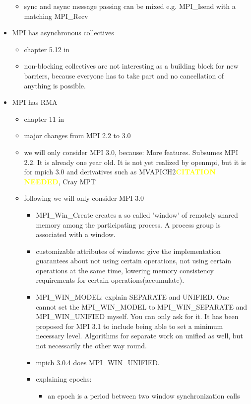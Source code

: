 \documentclass[a4paper, 10pt]{article}
\def \citationneeded{\textbf{\textcolor{yellow}{CITATION NEEDED}}}
\begin{document}
\begin{itemize}
\begin{itemize}
			\item sync and async message passing can be mixed e.g. MPI\_Isend with a matching MPI\_Recv
		\end{itemize}
	\item MPI has asynchronous collectives
		\begin{itemize}
			\item chapter 5.12 in \cite{mpi3}
			\item non-blocking collectives are not interesting as a building block for new barriers, because everyone has to take part and no cancellation of anything is possible.
		\end{itemize}
	\item MPI has RMA
		\begin{itemize}
			\item chapter 11 in \cite{mpi3}
			\item major changes from MPI 2.2 to 3.0\cite{mpi3onesided}
			\item we will only consider MPI 3.0, because: More features. Subsumes MPI 2.2. It is already one year old. It is not yet realized by openmpi, but it is for mpich 3.0 and derivatives such as MVAPICH2\citationneeded, Cray MPT\cite{craympt}
			\item following we will only consider MPI 3.0
				\begin{itemize}
					\item MPI\_Win\_Create creates a so called 'window' of remotely shared memory among the participating process. A process group is associated with a window.
					\item customizable attributes of windows: give the implementation guarantees about not using certain operations, not using certain operations at the same time, lowering memory consistency requirements for certain operations(accumulate).
					\item MPI\_WIN\_MODEL: explain SEPARATE and UNIFIED. One cannot set the MPI\_WIN\_MODEL to MPI\_WIN\_SEPARATE and MPI\_WIN\_UNIFIED myself. You can only ask for it. It has been proposed for MPI 3.1 to include being able to set a minimum necessary level. Algorithms for separate work on unified as well, but not necessarily the other way round.
					\item mpich 3.0.4 does MPI\_WIN\_UNIFIED.
					\item explaining epochs:
						\begin{itemize}
							\item an epoch is a period between two window synchronization calls

\end{itemize}
\end{itemize}
\end{itemize}
\end{itemize}
\end{document}
